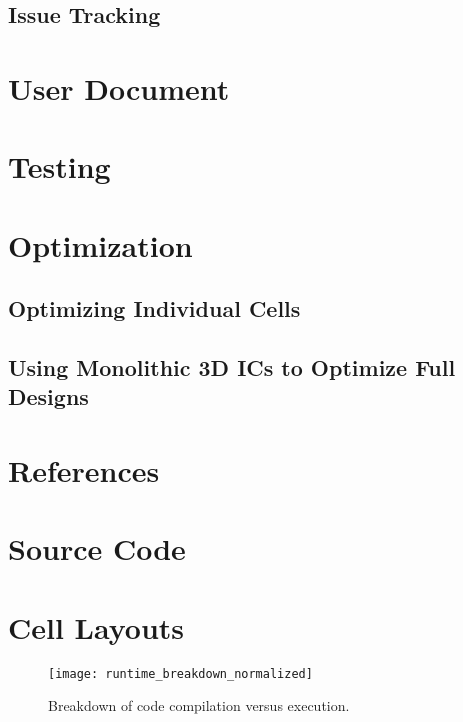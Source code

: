 \documentclass{article}
\begin{document}
\subsection{Issue Tracking}


\section{User Document}

\section{Testing}

\section{Optimization}
\subsection{Optimizing Individual Cells}
\subsection{Using Monolithic 3D ICs to Optimize Full Designs}

\paragraph{}


\newpage
\appendix 
\section{References}
\newpage
\section{Source Code}
\newpage
\section{Cell Layouts}

\begin{figure}[h!]
\centering
\texttt{[image: runtime\_breakdown\_normalized]}
\caption{\small Breakdown of code compilation versus execution.}
\end{figure}
\end{document}
